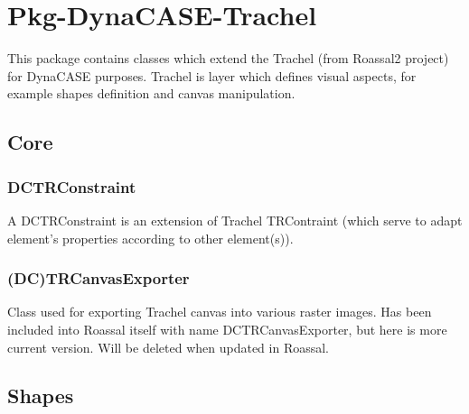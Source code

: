 \documentclass[a4paper,10pt,twoside]{book}
\begin{document}
\fi
\sloppy

\chapter{ Pkg-DynaCASE-Trachel}
This package contains classes which extend the Trachel (from Roassal2 project) for DynaCASE purposes.
Trachel is layer which defines visual aspects, for example shapes definition and canvas manipulation.
\section{ Core}\subsection{ DCTRConstraint}
A DCTRConstraint is an extension of Trachel TRContraint (which serve to adapt element's properties according to other element(s)).
\subsection{ (DC)TRCanvasExporter}
Class used for exporting Trachel canvas into various raster images.
Has been included into Roassal itself with name DCTRCanvasExporter, but here is more current version. Will be deleted when updated in Roassal.
\section{ Shapes}


\ifx\wholebook\relax\else
   
\end{document}
